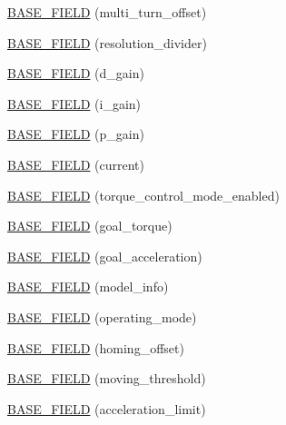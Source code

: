 \begin{DoxyCompactItemize}
\hyperlink{classdynamixel_1_1servos_1_1_base_servo_aa57f1bf9f68d5ff6bbee12ad9de25f03}{B\+A\+S\+E\+\_\+\+F\+I\+E\+LD} (multi\+\_\+turn\+\_\+offset)
\item 
\hyperlink{classdynamixel_1_1servos_1_1_base_servo_a046123a7102b0f8576a5379244dab59f}{B\+A\+S\+E\+\_\+\+F\+I\+E\+LD} (resolution\+\_\+divider)
\item 
\hyperlink{classdynamixel_1_1servos_1_1_base_servo_a2faa22f6a3eb0ec3e01e4ca427f11ddd}{B\+A\+S\+E\+\_\+\+F\+I\+E\+LD} (d\+\_\+gain)
\item 
\hyperlink{classdynamixel_1_1servos_1_1_base_servo_a2f96570d1a8c874bc38bfe53c19d6bba}{B\+A\+S\+E\+\_\+\+F\+I\+E\+LD} (i\+\_\+gain)
\item 
\hyperlink{classdynamixel_1_1servos_1_1_base_servo_a49e5eeb24d2f0a56e6450dffd8bd6d9c}{B\+A\+S\+E\+\_\+\+F\+I\+E\+LD} (p\+\_\+gain)
\item 
\hyperlink{classdynamixel_1_1servos_1_1_base_servo_a3e081b1577bbe5571cfcf277ebaeb90a}{B\+A\+S\+E\+\_\+\+F\+I\+E\+LD} (current)
\item 
\hyperlink{classdynamixel_1_1servos_1_1_base_servo_a828703bacd6f83b91a4c4bbe7cb45d7e}{B\+A\+S\+E\+\_\+\+F\+I\+E\+LD} (torque\+\_\+control\+\_\+mode\+\_\+enabled)
\item 
\hyperlink{classdynamixel_1_1servos_1_1_base_servo_af4433354d94851217d5931b528be26a1}{B\+A\+S\+E\+\_\+\+F\+I\+E\+LD} (goal\+\_\+torque)
\item 
\hyperlink{classdynamixel_1_1servos_1_1_base_servo_a87f4340b3d3c266be54fe22cb0573128}{B\+A\+S\+E\+\_\+\+F\+I\+E\+LD} (goal\+\_\+acceleration)
\item 
\hyperlink{classdynamixel_1_1servos_1_1_base_servo_a534b4f6823ed8c8c2e2b650d76aef90a}{B\+A\+S\+E\+\_\+\+F\+I\+E\+LD} (model\+\_\+info)
\item 
\hyperlink{classdynamixel_1_1servos_1_1_base_servo_afe1a1fd0d8a3195fc053186729e493d7}{B\+A\+S\+E\+\_\+\+F\+I\+E\+LD} (operating\+\_\+mode)
\item 
\hyperlink{classdynamixel_1_1servos_1_1_base_servo_a3feb535f2ec0d53f4b8dbb873e78875a}{B\+A\+S\+E\+\_\+\+F\+I\+E\+LD} (homing\+\_\+offset)
\item 
\hyperlink{classdynamixel_1_1servos_1_1_base_servo_ae380e8c4a76f8377bdb7112b3ad3fa68}{B\+A\+S\+E\+\_\+\+F\+I\+E\+LD} (moving\+\_\+threshold)
\item 
\hyperlink{classdynamixel_1_1servos_1_1_base_servo_a17a48b48ed6277f17477656977c373e3}{B\+A\+S\+E\+\_\+\+F\+I\+E\+LD} (acceleration\+\_\+limit)
\item 

\end{DoxyCompactItemize}
